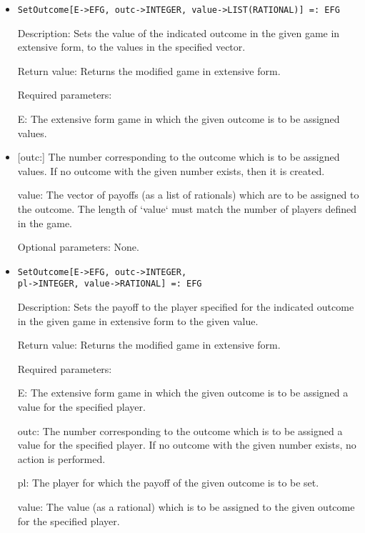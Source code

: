 \begin{itemize}
\item
\protect \large \begin{verbatim}
SetOutcome[E->EFG, outc->INTEGER, value->LIST(RATIONAL)] =: EFG
\end{verbatim}\normalsize
   
\bd
\item
[Description:] Sets the value of the indicated outcome in the given
game in extensive form, to the values in the specified vector.
\item
[Return value:] Returns the modified game in extensive form.
\item
[Required parameters:]\hfil\null
	
\bd
\item
[E:] The extensive form game in which the given outcome is to be
assigned values.
\item

[outc:] The number corresponding to the outcome which is to be
assigned values.  If no outcome with the given number exists, then it
is created.
\item
[value:] The vector of payoffs (as a list of rationals) which are to
be assigned to the outcome.  The length of `value` must match the
number of players defined in the game.
\ed

\item
[Optional parameters:] None.
\ed

\item

\protect \large \begin{verbatim} 
SetOutcome[E->EFG, outc->INTEGER,
pl->INTEGER, value->RATIONAL] =: EFG
\end{verbatim}\normalsize

\bd
\item
[Description:] Sets the payoff to the player specified for the
indicated outcome in the given game in extensive form to the given
value.
\item
[Return value:] Returns the modified game in extensive form.
\item
[Required parameters:]\hfil\null
	
\bd
\item
[E:] The extensive form game in which the given outcome is to be
assigned a value for the specified player.
\item
[outc:] The number corresponding to the outcome which is to be
assigned a value for the specified player.  If no outcome with the
given number exists, no action is performed.
\item
[pl:] The player for which the payoff of the given outcome is to be
set.
\item
[value:] The value (as a rational) which is to be assigned to the
given outcome for the specified player.
\ed
\ed


\end{itemize}

